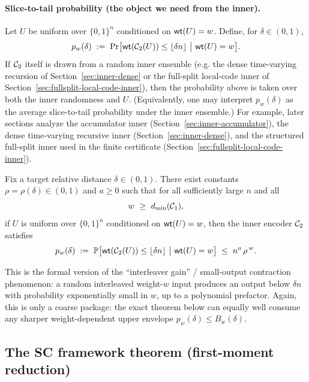 \paragraph{Slice-to-tail probability (the object we need from the inner).}
Let \(U\) be uniform over \(\{0,1\}^n\) conditioned on \(\mathsf{wt}(U)=w\).
Define, for \(\delta\in(0,1)\),
\begin{equation}
\label{eq:pw-def}
p_w(\delta)
\;:=\;
\Pr\bigl[\wt(\Ctwo(U))\le \lfloor\delta n\rfloor\ \big|\ \wt(U)=w\bigr].
\end{equation}
If \({\mathcal{C}_2}\) itself is drawn from a random inner ensemble
(e.g. the dense time-varying recursion of Section~\ref{sec:inner-dense}
or the full-split local-code inner of Section~\ref{sec:fullsplit-local-code-inner}),
then the probability above is taken over both the inner randomness and \(U\).
(Equivalently, one may interpret \(p_w(\delta)\) as the average slice-to-tail probability under the inner ensemble.)
For example, later sections analyze the accumulator inner (Section~\ref{sec:inner-accumulator}),
the dense time-varying recursive inner (Section~\ref{sec:inner-dense}),
and the structured full-split inner used in the finite certificate (Section~\ref{sec:fullsplit-local-code-inner}).

\begin{assumption}
\label{ass:inner-interface}
Fix a target relative distance $\delta\in(0,1)$.
There exist constants $\rho=\rho(\delta)\in(0,1)$ and $a\ge 0$ such that for all sufficiently large $n$ and all
\[
w \ \ge\ d_{\min}({\mathcal{C}_1}),
\]
if $U$ is uniform over $\{0,1\}^n$ conditioned on $\mathsf{wt}(U)=w$, then the inner encoder ${\mathcal{C}_2}$ satisfies
\begin{equation}
\label{eq:inner-interface-pw}
p_w(\delta)
\;:=\;
\mathbb{P}\big[\mathsf{wt}({\mathcal{C}_2}(U))\le \lfloor\delta n\rfloor \ \big|\ \mathsf{wt}(U)=w\big]
\;\le\;
n^{a}\,\rho^{\,w}.
\end{equation}
\end{assumption}


\noindent
This is the formal version of the ``interleaver gain'' / small-output contraction phenomenon:
a random interleaved weight-\(w\) input produces an output below \(\delta n\) with probability exponentially small in \(w\),
up to a polynomial prefactor.
Again, this is only a coarse package: the exact theorem below can equally well consume any sharper weight-dependent upper
envelope \(p_w(\delta)\le B_w(\delta)\).

\subsection{The SC framework theorem (first-moment reduction)}
\label{sec:framework-theorem}

